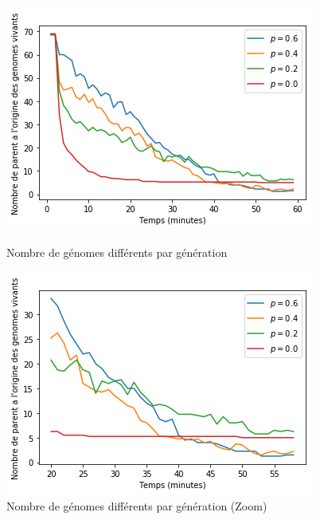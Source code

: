 \documentclass[a4paper]{article}
\begin{document}
\begin{figure}[h]
	\begin{minipage}[c]{.46\linewidth}
		\centering
		\includegraphics[width=1.1\linewidth]{../../script_results/nombre_genome_different.png}
		\caption{Nombre de génomes différents par génération}
	\end{minipage}
	\hfill%
	\begin{minipage}[c]{.46\linewidth}
		\centering
		\includegraphics[width=1.1\linewidth]{../../script_results/nombre_genome_different_zoom.png}
		\caption{Nombre de génomes différents par génération (Zoom)}
	\end{minipage}
\end{figure}
\newpage
\end{document}
